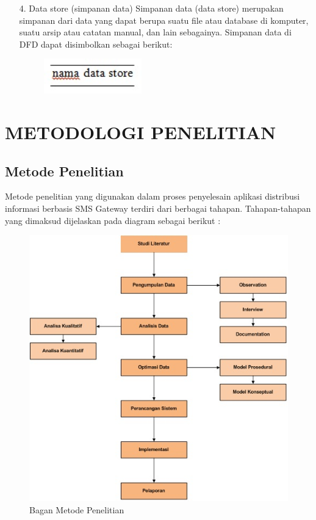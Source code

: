 \documentclass{jtetiproposalskripsi}
\begin{document}
\begin{itemize}
\item[4.]	Data store (simpanan data)
Simpanan data (data store) merupakan simpanan dari data yang dapat berupa suatu file atau database di komputer, suatu arsip atau catatan manual, dan lain sebagainya. 
Simpanan data di DFD dapat disimbolkan sebagai berikut:
\begin{figure}[ht!]
\centering
\includegraphics[width=0.4\textwidth]{gambar/Simpanan}
\label{wsn}
\end{figure}

\end{itemize}

\chapter{METODOLOGI PENELITIAN}

\section{Metode Penelitian}
Metode penelitian yang digunakan dalam proses penyelesain aplikasi distribusi informasi berbasis SMS Gateway  terdiri dari berbagai tahapan. Tahapan-tahapan yang dimaksud dijelaskan pada diagram sebagai berikut :

\begin{figure}[ht!]
\centering
\includegraphics[width=1\textwidth]{gambar/BaganMetode}
\caption{Bagan Metode Penelitian}
\label{wsn}
\end{figure}
\newpage
\end{document}
